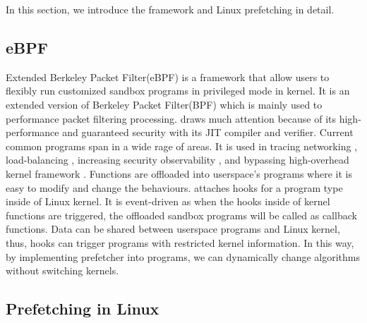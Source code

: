 In this section, we introduce the \ebpf framework and Linux prefetching in detail.

\subsection{eBPF}


Extended Berkeley Packet Filter(eBPF) is a framework that allow users to flexibly run customized sandbox programs in privileged mode in kernel.
It is an extended version of Berkeley Packet Filter(BPF) which is mainly used to performance packet filtering processing.
\ebpf draws much attention because of its high-performance and guaranteed security with its JIT compiler and verifier.
Current common \ebpf programs span in a wide rage of areas.
It is used in tracing networking \cite{bpftrace}, load-balancing \cite{Cilium, katran}, increasing security observability \cite{secure-namespace}, and bypassing high-overhead kernel framework \cite{BPF_storage, XRP}.
Functions are offloaded into userspace's programs where it is easy to modify and change the behaviours.
\ebpf attaches hooks for a program type inside of Linux kernel.
It is event-driven as when the hooks inside of kernel functions are triggered, the offloaded \ebpf sandbox programs will be called as callback functions.
Data can be shared between userspace programs and Linux kernel, thus, hooks can trigger \ebpf programs with restricted kernel information.
In this way, by implementing prefetcher into \ebpf programs, we can dynamically change algorithms without switching kernels.


\subsection{Prefetching in Linux}


